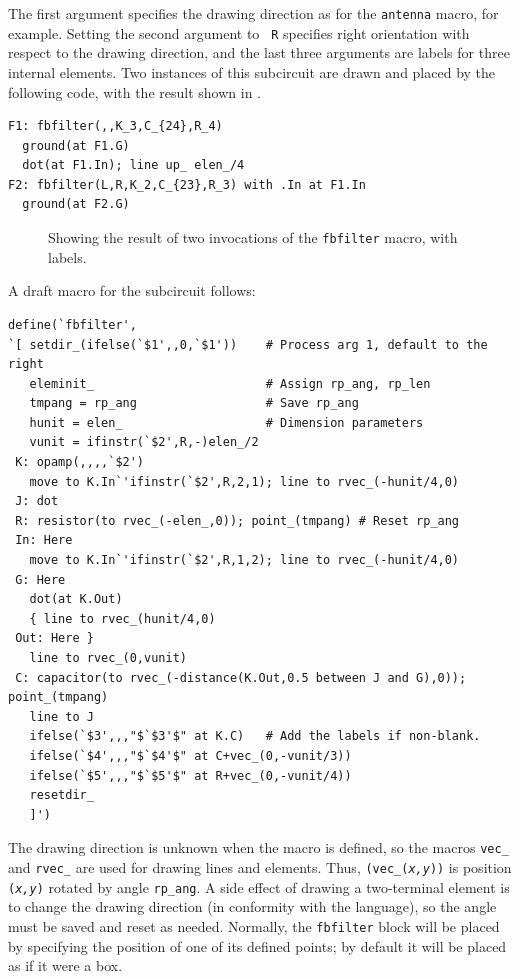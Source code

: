 \noindent The first argument specifies the drawing direction as for the
{\tt antenna} macro, for example.  Setting the second argument to {\tt
R} specifies right orientation with respect to the drawing direction,
and the last three arguments are labels
for three internal elements.  Two instances of this subcircuit are
drawn and placed by the following code, with the result
shown in .
\begin{verbatim}
F1: fbfilter(,,K_3,C_{24},R_4)
  ground(at F1.G)
  dot(at F1.In); line up_ elen_/4
F2: fbfilter(L,R,K_2,C_{23},R_3) with .In at F1.In
  ground(at F2.G)
\end{verbatim}
\vspace*{-0.5em}
\begin{figure}[H]
   
   \caption{Showing the result of two invocations of the {\tt fbfilter} macro,
     with labels.}
   \label{fbfilter}
   \end{figure}
A draft macro for the subcircuit follows:
\begin{verbatim}
define(`fbfilter',
`[ setdir_(ifelse(`$1',,0,`$1'))    # Process arg 1, default to the right
   eleminit_                        # Assign rp_ang, rp_len
   tmpang = rp_ang                  # Save rp_ang 
   hunit = elen_                    # Dimension parameters
   vunit = ifinstr(`$2',R,-)elen_/2
 K: opamp(,,,,`$2')
   move to K.In`'ifinstr(`$2',R,2,1); line to rvec_(-hunit/4,0)
 J: dot
 R: resistor(to rvec_(-elen_,0)); point_(tmpang) # Reset rp_ang
 In: Here
   move to K.In`'ifinstr(`$2',R,1,2); line to rvec_(-hunit/4,0)
 G: Here
   dot(at K.Out)
   { line to rvec_(hunit/4,0)
 Out: Here } 
   line to rvec_(0,vunit)
 C: capacitor(to rvec_(-distance(K.Out,0.5 between J and G),0)); point_(tmpang)
   line to J
   ifelse(`$3',,,"$`$3'$" at K.C)   # Add the labels if non-blank.
   ifelse(`$4',,,"$`$4'$" at C+vec_(0,-vunit/3))
   ifelse(`$5',,,"$`$5'$" at R+vec_(0,-vunit/4))
   resetdir_
   ]')
\end{verbatim}
The drawing direction is unknown when the macro is defined, so the
macros {\tt vec\_} and {\tt rvec\_} are used for drawing lines and
elements.
Thus, {\tt (vec\_({\sl x,y}))} is position {\tt ({\sl x,y})} rotated
by angle {\tt rp\_ang}.
A side effect of drawing a two-terminal element is to change the
drawing direction (in conformity with the \pic language), so the angle must
be saved and reset as needed. Normally, the {\tt fbfilter} block will be
placed by specifying the position of one of its defined points; by
default it will be placed as if it were a box.
\fi

